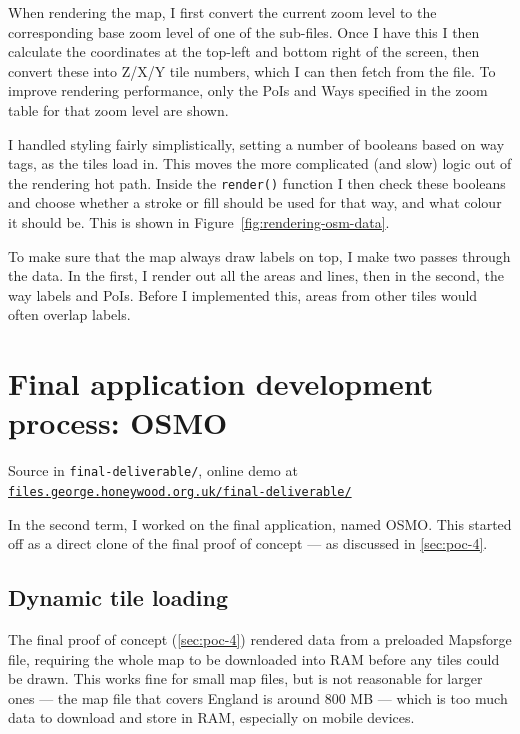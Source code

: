 \documentclass[hyphens]{final_report}
\begin{document}
When rendering the map, I first convert the current zoom level to the corresponding base zoom level of one of the sub-files. Once I have this I then calculate the coordinates at the top-left and bottom right of the screen, then convert these into Z/X/Y tile numbers, which I can then fetch from the file. To improve rendering performance, only the PoIs and Ways specified in the zoom table for that zoom level are shown.

I handled styling fairly simplistically, setting a number of booleans based on way tags, as the tiles load in. This moves the more complicated (and slow) logic out of the rendering hot path. Inside the \texttt{render()} function I then check these booleans and choose whether a stroke or fill should be used for that way, and what colour it should be. This is shown in Figure~\ref{fig:rendering-osm-data}.

To make sure that the map always draw labels on top, I make two passes through the data. In the first, I render out all the areas and lines, then in the second, the way labels and PoIs. Before I implemented this, areas from other tiles would often overlap labels.

\clearpage
\chapter{Final application development process: OSMO}

{ \footnotesize Source in \texttt{final-deliverable/}, online demo at \href{https://files.george.honeywood.org.uk/final-deliverable/#16/51.4313/-0.5472}{\nolinkurl{files.george.honeywood.org.uk/final-deliverable/}} }


In the second term, I worked on the final application, named OSMO. This started off as a direct clone of the final proof of concept --- as discussed in \autoref{sec:poc-4}.

\section{Dynamic tile loading}

The final proof of concept (\autoref{sec:poc-4}) rendered data from a preloaded Mapsforge file, requiring the whole map to be downloaded into RAM before any tiles could be drawn. This works fine for small map files, but is not reasonable for larger ones --- the map file that covers England is around 800 MB --- which is too much data to download and store in RAM, especially on mobile devices.
\end{document}
